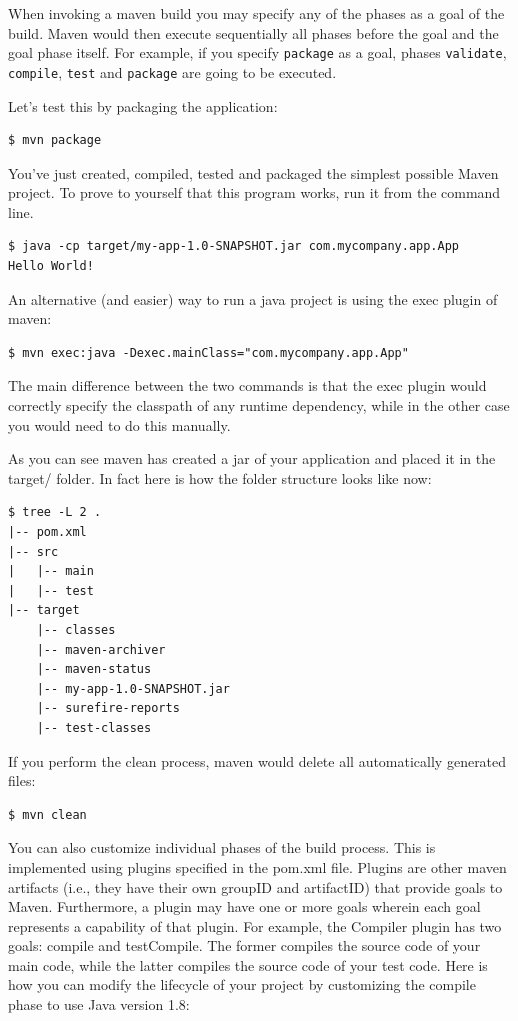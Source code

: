 \documentclass{article}
\begin{document}
When invoking a maven build you may specify any of the phases as a
goal of the build. Maven would then execute sequentially all phases
before the goal and the goal phase itself. For example, if you specify
\texttt{package} as a goal, phases \texttt{validate},
\texttt{compile}, \texttt{test} and \texttt{package} are going to be
executed.

Let's test this by packaging the application:

\begin{lstlisting}
$ mvn package
\end{lstlisting}

You’ve just created, compiled, tested and packaged the
simplest possible Maven project. To prove to yourself that this
program works, run it from the command line.

\begin{lstlisting}
$ java -cp target/my-app-1.0-SNAPSHOT.jar com.mycompany.app.App
Hello World!
\end{lstlisting}

An alternative (and easier) way to run a java project is using the
exec plugin of maven:

\begin{lstlisting}
$ mvn exec:java -Dexec.mainClass="com.mycompany.app.App"
\end{lstlisting}

The main difference between the two commands is that the exec plugin
would correctly specify the classpath of any runtime dependency, while
in the other case you would need to do this manually.

As you can see maven has created a jar of your application and placed
it in the target/ folder. In fact here is how the folder structure
looks like now:

\begin{lstlisting}
$ tree -L 2 .
|-- pom.xml
|-- src
|   |-- main
|   |-- test
|-- target
    |-- classes
    |-- maven-archiver
    |-- maven-status
    |-- my-app-1.0-SNAPSHOT.jar
    |-- surefire-reports
    |-- test-classes
\end{lstlisting}

If you perform the clean process, maven would delete all automatically
generated files:

\begin{lstlisting}
$ mvn clean
\end{lstlisting}

You can also customize individual phases of the build process. This is
implemented using plugins specified in the pom.xml file. Plugins are
other maven artifacts (i.e., they have their own groupID and
artifactID) that provide goals to Maven. Furthermore, a plugin may
have one or more goals wherein each goal represents a capability of
that plugin. For example, the Compiler plugin has two goals: compile
and testCompile. The former compiles the source code of your main
code, while the latter compiles the source code of your test code. 
Here is how you can modify the lifecycle of your project by
customizing the compile phase to use Java version 1.8:
\end{document}
